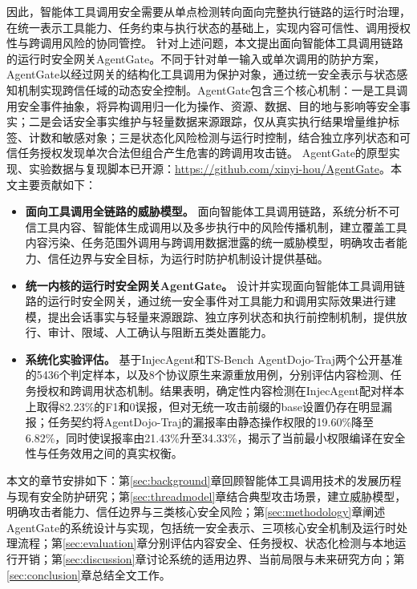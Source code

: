 因此，智能体工具调用安全需要从单点检测转向面向完整执行链路的运行时治理，在统一表示工具能力、任务约束与执行状态的基础上，实现内容可信性、调用授权性与跨调用风险的协同管控。
针对上述问题，本文提出面向智能体工具调用链路的运行时安全网关AgentGate。不同于针对单一输入或单次调用的防护方案，AgentGate以经过网关的结构化工具调用为保护对象，通过统一安全表示与状态感知机制实现跨信任域的动态安全控制。AgentGate包含三个核心机制：一是工具调用安全事件抽象，将异构调用归一化为操作、资源、数据、目的地与影响等安全事实；二是会话安全事实维护与轻量数据来源跟踪，仅从真实执行结果增量维护标签、计数和敏感对象；三是状态化风险检测与运行时控制，结合独立序列状态和可信任务授权发现单次合法但组合产生危害的跨调用攻击链。
AgentGate的原型实现、实验数据与复现脚本已开源：\url{https://github.com/xinyi-hou/AgentGate}。本文主要贡献如下：

\begin{itemize}

\item \textbf{面向工具调用全链路的威胁模型。}
面向智能体工具调用链路，系统分析不可信工具内容、智能体生成调用以及多步执行中的风险传播机制，建立覆盖工具内容污染、任务范围外调用与跨调用数据泄露的统一威胁模型，明确攻击者能力、信任边界与安全目标，为运行时防护机制设计提供基础。

\item \textbf{统一内核的运行时安全网关AgentGate。}
设计并实现面向智能体工具调用链路的运行时安全网关，通过统一安全事件对工具能力和调用实际效果进行建模，提出会话事实与轻量来源跟踪、独立序列状态和执行前控制机制，提供放行、审计、限域、人工确认与阻断五类处置能力。

\item \textbf{系统化实验评估。}
基于InjecAgent和TS-Bench AgentDojo-Traj两个公开基准的5436个判定样本，以及8个协议原生来源重放用例，分别评估内容检测、任务授权和跨调用状态机制。结果表明，确定性内容检测在InjecAgent配对样本上取得82.23\%的F1和0误报，但对无统一攻击前缀的base设置仍存在明显漏报；任务契约将AgentDojo-Traj的漏报率由静态操作权限的19.60\%降至6.82\%，同时使误报率由21.43\%升至34.33\%，揭示了当前最小权限编译在安全性与任务效用之间的真实权衡。

\end{itemize}


本文的章节安排如下：第\ref{sec:background}章回顾智能体工具调用技术的发展历程与现有安全防护研究；第\ref{sec:threadmodel}章结合典型攻击场景，建立威胁模型，明确攻击者能力、信任边界与三类核心安全风险；第\ref{sec:methodology}章阐述AgentGate的系统设计与实现，包括统一安全表示、三项核心安全机制及运行时处理流程；第\ref{sec:evaluation}章分别评估内容安全、任务授权、状态化检测与本地运行开销；第\ref{sec:discussion}章讨论系统的适用边界、当前局限与未来研究方向；第\ref{sec:conclusion}章总结全文工作。

